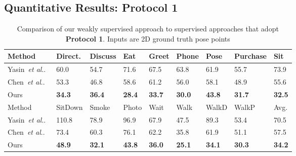\documentclass[runningheads]{llncs}
\makeatletter
\DeclareRobustCommand\onedot{\futurelet\@let@token\@onedot}
\def\@onedot{\ifx\@let@token.\else.\null\fi\xspace}
\def\etal{\emph{et al}\onedot}
\makeatother
\begin{document}
\subsection{Quantitative Results: Protocol 1}\label{sect:quantitative}\begin{table*}[htb!]
\caption{Comparison of our weakly supervised approach to supervised approaches that adopt \textbf{Protocol 1}. Inputs are 2D ground truth pose points}
\label{table:protocol1_gt}
	\centering
	\begin{tabularx}{\textwidth}{ l *{8}{Y} }
			
		\toprule
		Method & Direct. & Discuss & Eat & Greet & Phone & Pose & Purchase & Sit\\
		\midrule
		Yasin~\etal~\cite{Yasin_2016_CVPR} & 60.0 & 54.7 & 71.6 & 67.5 & 63.8 & 61.9 & 55.7 & 73.9  \\
		Chen~\etal~\cite{ChenDeva2017}  &{53.3} &{46.8} &{58.6} &{61.2} &{56.0} &{58.1} &{48.9} &{55.6}\\
		Ours  &\textbf{34.3} &\textbf{36.4} &\textbf{28.4} &\textbf{33.7} &\textbf{30.0} &\textbf{43.8} &\textbf{31.7} &\textbf{32.5}\\
		\bottomrule
		\toprule
		Method  & SitDown & Smoke & Photo & Wait & Walk & WalkD & WalkP & Avg.\\
		\midrule
		Yasin~\etal~\cite{Yasin_2016_CVPR} & 110.8 & 78.9 & 96.9 & 67.9 & 47.5 & 89.3 & 53.4 & 70.5  \\
		Chen~\etal~\cite{ChenDeva2017} & {73.4} & {60.3} &{76.1} &{62.2} &{35.8} &{61.9} &{51.1} & {57.5} \\		
		Ours &\textbf{48.9}&\textbf{32.1} &\textbf{43.8} &\textbf{36.0} &\textbf{25.1} &\textbf{34.1} &\textbf{30.3} & \textbf{34.2} \\
		\bottomrule
	\end{tabularx}
\end{table*}\begin{table*}[t]
	\centering
\caption{Comparison of our weakly supervised approach to supervised approaches that adopt \textbf{Protocol 1}. Inputs are 2D detected pose points. SH denotes stacked hourglass pose detector}
\label{table:protocol1_sh}

\end{table*}
\end{document}
